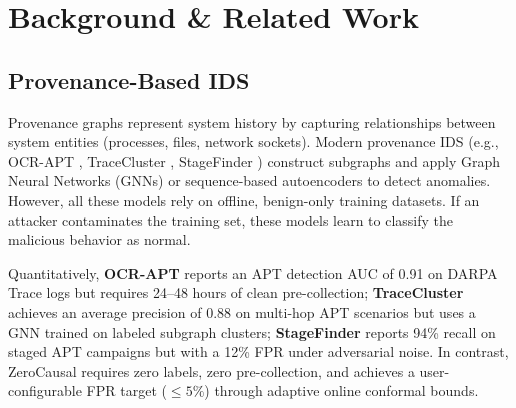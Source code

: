 \section{Background \& Related Work}

\subsection{Provenance-Based IDS}
Provenance graphs represent system history by capturing relationships between system entities (processes, files, network sockets). Modern provenance IDS (e.g., OCR-APT \cite{ocrapt2025}, TraceCluster \cite{tracecluster2026}, StageFinder \cite{stagefinder2026}) construct subgraphs and apply Graph Neural Networks (GNNs) or sequence-based autoencoders to detect anomalies. However, all these models rely on offline, benign-only training datasets. If an attacker contaminates the training set, these models learn to classify the malicious behavior as normal.

Quantitatively, \textbf{OCR-APT} \cite{ocrapt2025} reports an APT detection AUC of 0.91 on DARPA Trace logs but requires 24--48 hours of clean pre-collection; \textbf{TraceCluster} \cite{tracecluster2026} achieves an average precision of 0.88 on multi-hop APT scenarios but uses a GNN trained on labeled subgraph clusters; \textbf{StageFinder} \cite{stagefinder2026} reports 94\% recall on staged APT campaigns but with a 12\% FPR under adversarial noise. In contrast, ZeroCausal requires zero labels, zero pre-collection, and achieves a user-configurable FPR target ($\leq 5\%$) through adaptive online conformal bounds.

